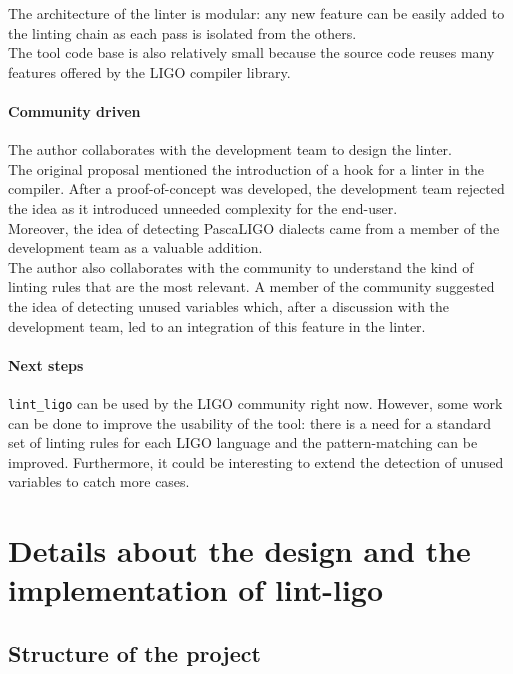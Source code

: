 \documentclass[10pt,a4paper]{article}
\begin{document}
The architecture of the linter is modular: any new feature can be easily added to the linting chain as each pass is isolated from the others.\\
The tool code base is also relatively small because the source code reuses many features offered by the LIGO compiler library.

\paragraph{Community driven}
The author collaborates with the development team to design the linter.\\
The original proposal mentioned the introduction of a hook for a linter in the compiler. After a proof-of-concept was developed, the development team rejected the idea as it introduced unneeded complexity for the end-user.\\
Moreover, the idea of detecting PascaLIGO dialects came from a member of the development team as a valuable addition.\\

The author also collaborates with the community to understand the kind of linting rules that are the most relevant. A member of the community suggested the idea of detecting unused variables which, after a discussion with the development team, led to an integration of this feature in the linter.

\paragraph{Next steps}

\verb|lint_ligo| can be used by the LIGO community right now.
However, some work can be done to improve the usability of the tool: there is a need for a standard set of linting rules for each LIGO language and the pattern-matching can be improved.
Furthermore, it could be interesting to extend the detection of unused variables to catch more cases.

\section{Details about the design and the implementation of lint-ligo}

\subsection{Structure of the project}
\end{document}
